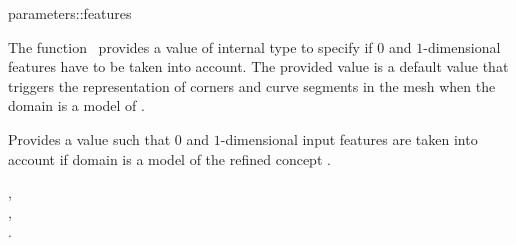 \ccRefPageBegin


\begin{ccRefFunction}{parameters::features}  %


\ccDefinition
  
The function \ccRefName\  provides a  value of internal type 
to specify if  $0$ and $1$-dimensional features have to be taken into account.
The provided value is a default value that triggers the representation
of corners and  curve segments in the mesh when the domain is a model
of  .


Provides a  value such that
 $0$ and $1$-dimensional input features are taken into account
 if domain is a model of  the refined concept .

\ccSeeAlso

, \\
, \\
. \\





\end{ccRefFunction}

\ccRefPageEnd

